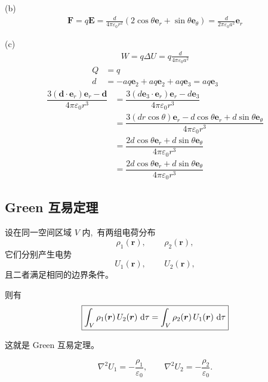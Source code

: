 (b)
\begin{align*}
    \boldsymbol F
    =q\boldsymbol E
    =\frac{d}{4\pi\varepsilon_0r^2}(2\cos\theta\boldsymbol{e}_r+\sin\theta\boldsymbol{e}_\theta)
    =\frac{d}{2\pi\varepsilon_0a^2}\boldsymbol{e}_r
\end{align*}

(c)
\begin{align*}
    W=q\Delta U=q\frac{d}{4\pi\varepsilon_0a^2}
\end{align*}
\begin{align*}
    Q&=q\\
    d&=-aq\boldsymbol{e}_2+aq\boldsymbol{e}_2+aq\boldsymbol{e}_3=aq\boldsymbol{e}_3
\end{align*}
\begin{align*}
    \dfrac{3(\boldsymbol{d}\cdot\boldsymbol{e}_r)\boldsymbol{e}_r-\boldsymbol{d}}{4\pi\varepsilon_0r^3}
    &=\dfrac{3(d\boldsymbol{e}_3\cdot \boldsymbol{e}_r)\boldsymbol{e}_r-d\boldsymbol{e}_3}{4\pi\varepsilon_0r^3}\\
    &=\dfrac{3(dr\cos\theta)\boldsymbol{e}_r-d\cos\theta\boldsymbol{e}_r+d\sin\theta\boldsymbol{e}_\theta}{4\pi\varepsilon_0r^3}\\
    &=\dfrac{2d\cos\theta\boldsymbol{e}_r+d\sin\theta\boldsymbol{e}_\theta}{4\pi\varepsilon_0r^3}\\
    &=\dfrac{2d\cos\theta\boldsymbol{e}_r+d\sin\theta\boldsymbol{e}_\theta}{4\pi\varepsilon_0r^3}
\end{align*}
\subsection{Green 互易定理}

设在同一空间区域 \(V\) 内, \,有两组电荷分布
\[
\rho_1(\boldsymbol  r), \,\qquad \rho_2(\boldsymbol  r),
\]
它们分别产生电势
\[
U_1(\boldsymbol  r), \,\qquad U_2(\boldsymbol  r),
\]
且二者满足相同的边界条件。

则有
\[
\boxed{
\int_V \rho_1(\boldsymbol  r)\,U_2(\boldsymbol  r)\,\dif\tau
=
\int_V \rho_2(\boldsymbol  r)\,U_1(\boldsymbol  r)\,\dif\tau
}
\]

这就是 Green 互易定理。

\[
\nabla^2 U_1
=
-\frac{\rho_1}{\varepsilon_0},
\qquad
\nabla^2 U_2
=
-\frac{\rho_2}{\varepsilon_0}.
\]

